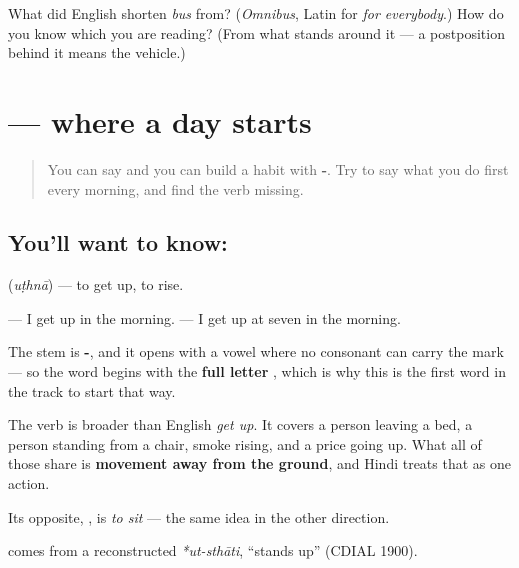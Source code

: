 \begin{tcolorbox}[breakable,colback=teal!4,colframe=teal!35!black,title={Before you move on}]
What did English shorten \emph{bus} from? (\emph{Omnibus}, Latin for \emph{for everybody}.) How do you know which \textbf{} you are reading? (From what stands around it — a postposition behind it means the vehicle.)
\end{tcolorbox}
\section[\texorpdfstring{\hi{उठना} (uṭhnā)}{उठना (uṭhnā)}]{ — where a day starts}

\label{lesson:HI-C90-uthna}



\begin{quote}
You can say \textbf{} and you can build a habit with \textbf{-}. Try to say what you do first every morning, and find the verb missing.
\end{quote}

\subsection*{You'll want to know: }
\textbf{} (\emph{uṭhnā}) — to get up, to rise.

\textbf{   } — I get up in the morning. \textbf{     } — I get up at seven in the morning.

\begin{cousinweb}
The stem is \textbf{-}, and it opens with a vowel where no consonant can carry the mark — so the word begins with the \textbf{full letter }, which is why this is the first word in the track to start that way.

The verb is broader than English \emph{get up}. It covers a person leaving a bed, a person standing from a chair, smoke rising, and a price going up. What all of those share is \textbf{movement away from the ground}, and Hindi treats that as one action.

Its opposite, \textbf{}, is \emph{to sit} — the same idea in the other direction.

\textbf{} comes from a reconstructed \emph{*ut-sthāti}, \textquotedblleft{}stands up\textquotedblright{} (CDIAL 1900).
\end{cousinweb}

